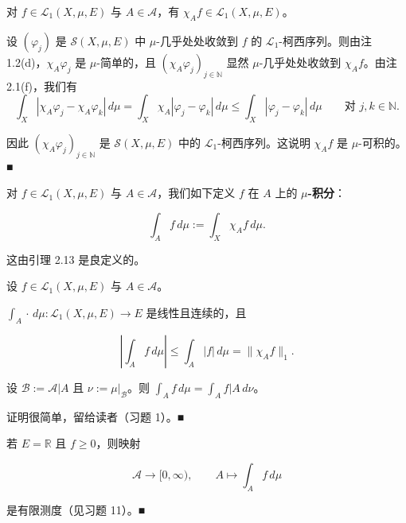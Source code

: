 \begin{lemma}

对 $ f \in \mathcal{L}_1(X,\mu,E) $ 与 $ A \in \mathcal{A} $，有 $ \chi_A f \in \mathcal{L}_1(X,\mu,E) $。

\proofhead
设 $ (\varphi_j) $ 是 $ \mathcal{S}(X,\mu,E) $ 中 $ \mu $-几乎处处收敛到 $ f $ 的 $ \mathcal{L}_1 $-柯西序列。则由注 1.2(d)，$ \chi_A \varphi_j $ 是 $ \mu $-简单的，且 $ (\chi_A \varphi_j)_{j \in \mathbb{N}} $ 显然 $ \mu $-几乎处处收敛到 $ \chi_A f $。由注 2.1(f)，我们有
\[
\int_X |\chi_A \varphi_j - \chi_A \varphi_k| \, d\mu = \int_X \chi_A |\varphi_j - \varphi_k| \, d\mu \le \int_X |\varphi_j - \varphi_k| \, d\mu \qquad \text{对 } j, k \in \mathbb{N} .
\]

因此 $ (\chi_A \varphi_j)_{j \in \mathbb{N}} $ 是 $ \mathcal{S}(X,\mu,E) $ 中的 $ \mathcal{L}_1 $-柯西序列。这说明 $ \chi_A f $ 是 $ \mu $-可积的。\nobreak\hspace{0.35em}■

\end{lemma}

对 $ f \in \mathcal{L}_1(X,\mu,E) $ 与 $ A \in \mathcal{A} $，我们如下定义 $ f $ 在 $ A $ 上的 \textbf{$ \mu $-积分}：

\[
\int_A f \, d\mu := \int_X \chi_A f \, d\mu .
\]

这由引理 2.13 是良定义的。

\begin{remark}

设 $ f \in \mathcal{L}_1(X,\mu,E) $ 与 $ A \in \mathcal{A} $。

\begin{items}
\item

$ \int_A \cdot \, d\mu: \mathcal{L}_1(X,\mu,E) \to E $ 是线性且连续的，且

\[
\left| \int_A f \, d\mu \right| \le \int_A |f| \, d\mu = \|\chi_A f\|_1 .
\]
\item

设 $ \mathcal{B} := \mathcal{A}|A $ 且 $ \nu := \mu|_{\mathcal{B}} $。则 $ \int_A f \, d\mu = \int_A f|A \, d\nu $。

\proofhead
证明很简单，留给读者（习题 1）。\nobreak\hspace{0.35em}■
\item

若 $ E = \mathbb{R} $ 且 $ f \ge 0 $，则映射

\[
\mathcal{A} \to [0,\infty) , \qquad A \mapsto \int_A f \, d\mu
\]

是有限测度（见习题 11）。\nobreak\hspace{0.35em}■

\end{items}

\end{remark}

